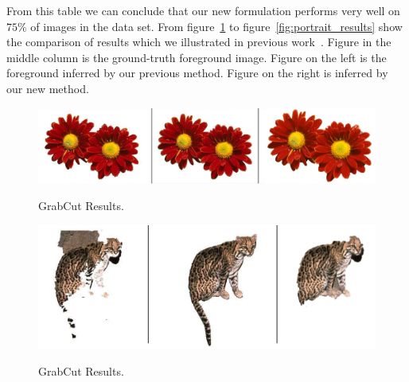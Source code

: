 From this table we can conclude that our new formulation performs
very well on $75\%$ of images in the data set. From
figure~\ref{fig:flower_results} to
figure~\ref{fig:portrait_results} show the comparison of results
which we illustrated in previous work~\cite{gouldlearning}.
Figure in the middle column is the ground-truth foreground image.
Figure on the left is the foreground inferred by our previous
method. Figure on the right is inferred by our new method.


\begin{figure}[ht]
  \begin{center} \setlength{\tabcolsep}{0pt}
    \includegraphics[width=\linewidth]{Experiments/figures/124080.png}
\\
  \caption{\label{fig:flower_results}GrabCut Results.}
  \end{center}
\end{figure}

\begin{figure}[ht]
  \begin{center} \setlength{\tabcolsep}{0pt}
    \includegraphics[width=\linewidth]{Experiments/figures/326038.png}
\\
  \caption{\label{fig:cheetah_results}GrabCut Results.}
  \end{center}
\end{figure}

